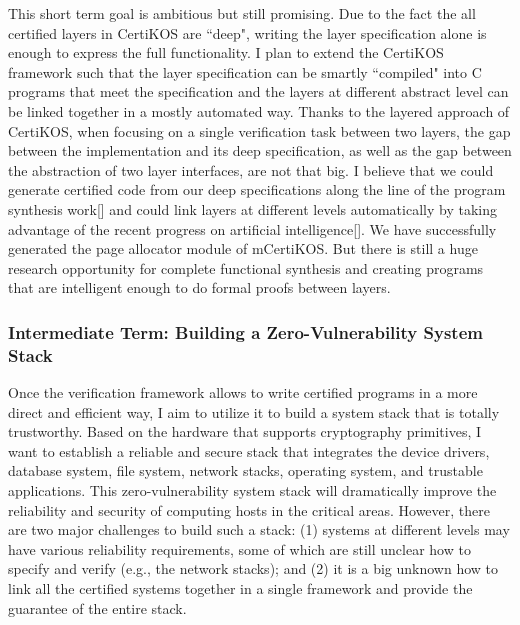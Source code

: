 \documentclass[a4paper, 10pt]{article}
\begin{document}
\begin{small}
This short term goal is ambitious  but still promising.
Due to the fact the all certified layers in CertiKOS
are ``deep", writing the layer specification alone is enough
to express the full functionality. I plan to extend the CertiKOS
framework such that the layer specification can be smartly 
``compiled" into C programs that meet the specification
and the layers at different abstract level can be linked together in a mostly automated way. Thanks to the layered approach of CertiKOS,
when focusing on a single verification task between two layers,
 the gap between the implementation and its deep specification, as well as the gap between the abstraction of two layer interfaces,
are not that big. I believe that we could generate
certified code from our deep specifications
along the line of the program synthesis work[]
and could link layers at different levels automatically
by taking advantage of the recent progress on
artificial intelligence[]. We have successfully generated
the page allocator module of mCertiKOS. But there is
still a huge research opportunity for complete functional
synthesis and creating programs that are intelligent enough
to do formal proofs between layers.

\subsubsection*{\small Intermediate Term: Building a Zero-Vulnerability System Stack}
Once the verification framework allows to write certified programs in a more direct and efficient way, I aim to utilize it to build a system stack that is totally trustworthy. Based on the hardware that supports cryptography primitives, I want to
establish a reliable and secure stack that integrates the device drivers,
database system, file system, network stacks, operating system,
 and trustable applications.
This zero-vulnerability system stack will dramatically improve
the reliability and security of computing hosts in the critical areas. 
However, there are two major challenges to build such a stack:
(1)  systems at different levels may have various
reliability requirements, some of which are still unclear how
to specify and verify (e.g., the network stacks); and (2)
it is a big unknown how to link
all the certified systems together in a single framework
and provide the guarantee of the entire stack.


\end{small}
\end{document}
